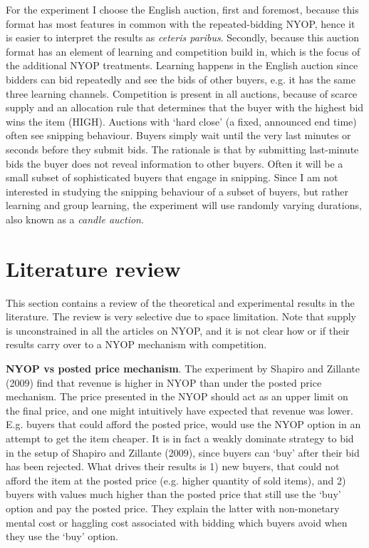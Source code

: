 \documentclass[a4paper,12pt]{article}
\begin{document}
	For the experiment I choose the English auction, first and foremost, because this format has most features in common with the repeated-bidding NYOP, hence it is easier to interpret the results as {\it ceteris paribus}. Secondly, because this auction format has an element of learning and competition build in, which is the focus of the additional NYOP treatments. Learning happens in the English auction since bidders can bid repeatedly and see the bids of other buyers, e.g. it has the same three learning channels. Competition is present in all auctions, because of scarce supply and an allocation rule that determines that the buyer with the highest bid wins the item (HIGH). Auctions with `hard close' (a fixed, announced end time) often see snipping behaviour. Buyers simply wait until the very last minutes or seconds before they submit bids. The rationale is that by submitting last-minute bids the buyer does not reveal information to other buyers. Often it will be a small subset of sophisticated buyers that engage in snipping. Since I am not interested in studying the snipping behaviour of a subset of buyers, but rather learning and group learning, the experiment will use randomly varying durations, also known as a {\it candle auction}.

	\section{Literature review}

	This section contains a review of the theoretical and experimental results in the literature. The review is very selective due to space limitation. Note that supply is unconstrained in all the articles on NYOP, and it is not clear how or if their results carry over to a NYOP mechanism with competition.

	{\bf NYOP vs posted price mechanism}. The experiment by Shapiro and Zillante (2009) find that revenue is higher in NYOP than under the posted price mechanism. The price presented in the NYOP should act as an upper limit on the final price, and one might intuitively have expected that revenue was lower. E.g. buyers that could afford the posted price, would use the NYOP option in an attempt to get the item cheaper. It is in fact a weakly dominate strategy to bid in the setup of Shapiro and Zillante (2009), since buyers can `buy' after their bid has been rejected. What drives their results is 1) new buyers, that could not afford the item at the posted price (e.g. higher quantity of sold items), and 2) buyers with values much higher than the posted price that still use the `buy' option and pay the posted price. They explain the latter with non-monetary mental cost or haggling cost associated with bidding which buyers avoid when they use the `buy' option.
\end{document}
